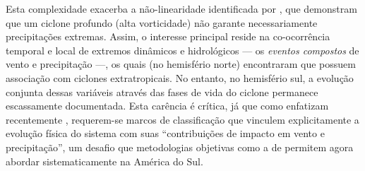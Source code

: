 Esta complexidade exacerba a não-linearidade identificada por \citet{sinclair2023relationship}, que demonstram que um ciclone profundo (alta vorticidade) não garante necessariamente precipitações extremas.
Assim, o interesse principal reside na co-ocorrência temporal e local de extremos dinâmicos e hidrológicos — os \textit{eventos compostos} de vento e precipitação —, os quais \citet{chen2025characteristics} (no hemisfério norte) encontraram que possuem associação com ciclones extratropicais.
No entanto, no hemisfério sul, a evolução conjunta dessas variáveis através das fases de vida do ciclone permanece escassamente documentada. Esta carência é crítica, já que como enfatizam recentemente \citet{han2025system}, requerem-se marcos de classificação que vinculem explicitamente a evolução física do sistema com suas ``contribuições de impacto em vento e precipitação'', um desafio que metodologias objetivas como a de \citet{coutodesouza2024new} permitem agora abordar sistematicamente na América do Sul.

